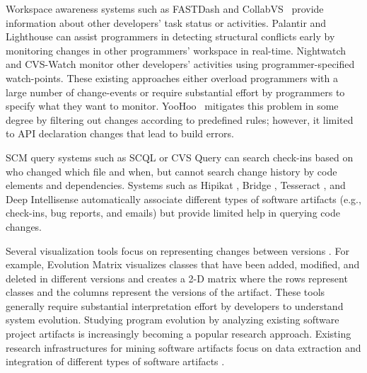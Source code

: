 \documentclass[runningheads,a4paper]{llncs}
\begin{document}
Workspace awareness systems such as FASTDash \cite{Biehl2007} and CollabVS~\cite{Hegde2008:collabVS} provide information about other developers' task status or activities. Palantir \cite{Sarma2003} and Lighthouse \cite{daSilva2006} can assist programmers in detecting structural conflicts early by monitoring changes in other programmers' workspace in real-time. Nightwatch \cite{OReilly2003} and CVS-Watch \cite{Berliner1990:cvs2} monitor other developers' activities using programmer-specified watch-points. These existing approaches either overload programmers with a large number of change-events or require substantial effort by programmers to specify what they want to monitor. YooHoo~\cite{Holmes2010:Yoohoo} mitigates this problem in some degree by filtering out changes according to predefined rules; however, it limited to API declaration changes that lead to build errors. 

 
SCM query systems such as SCQL \cite{Hindle2005} or CVS Query \cite{bonsai} can search check-ins based on who changed which file and when, but cannot search change history by code elements and dependencies. Systems such as Hipikat \cite{Cubranic2003}, Bridge \cite{Venolia2006:bridge}, Tesseract \cite{Sarma2009:tesseract}, and Deep Intellisense \cite{Holmes2008:intellisense} automatically associate different types of software artifacts (e.g., check-ins, bug reports, and emails) but provide limited help in querying code changes. 


Several visualization tools focus on representing changes between versions \cite{Ball1996,Eick2002,Girba2004,Holt1996,Lanza2001,Lanza2003,Rysselberghe2004a}. For example, Evolution Matrix \cite{Lanza2001} visualizes classes that have been added, modified, and deleted in different versions and creates a 2-D matrix where the rows represent classes and the columns represent the versions of the artifact. These tools generally require substantial interpretation effort by developers to understand system evolution. Studying program evolution by analyzing existing software project artifacts is increasingly becoming a popular research approach. Existing research infrastructures for mining software artifacts focus on data extraction \cite{Bevan2005,Fischer2003} and integration of different types of software artifacts \cite{Cubranic2003, Venolia2006:bridge, Sarma2009:tesseract, Begel2010:codebook}. 
\end{document}
